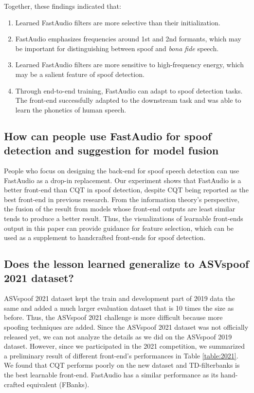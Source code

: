 \documentclass[conference]{IEEEtran}
\begin{document}
Together, these findings indicated that:
\begin{enumerate}

        \item Learned FastAudio filters are more selective than their initialization.
        \item FastAudio emphasizes frequencies around 1st and 2nd formants, which may be important for distinguishing between spoof and \textit{bona fide} speech.
        \item Learned FastAudio filters are more sensitive to high-frequency energy, which may be a salient feature of spoof detection.
        \item Through end-to-end training, FastAudio can adapt to spoof detection tasks. The front-end successfully adapted to the downstream task and was able to learn the phonetics of human speech.

\end{enumerate}

\subsection{\textbf{How can people use FastAudio for spoof detection and suggestion for model fusion}}

People who focus on designing the back-end for spoof speech detection can use FastAudio as a drop-in replacement. Our experiment shows that FastAudio is a better front-end than CQT in spoof detection, despite CQT being reported as the best front-end in previous research\cite{Li2021ReplayAS}. From the information theory's perspective, the fusion of the result from models whose front-end outputs are least similar tends to produce a better result. Thus, the visualizations of learnable front-ends output in this paper can provide guidance for feature selection, which can be used as a supplement to handcrafted front-ends for spoof detection\cite{Xiao2015SpoofingSD}.

\subsection{\textbf{Does the lesson learned generalize to ASVspoof 2021 dataset?}}

ASVspoof 2021 dataset kept the train and development part of 2019 data the same and added a much larger evaluation dataset that is 10 times the size as before. Thus, the ASVspoof 2021 challenge is more difficult because more spoofing techniques are added. Since the ASVspoof 2021 dataset was not officially released yet, we can not analyze the details as we did on the ASVspoof 2019 dataset. However, since we participated in the 2021 competition, we summarized a preliminary result of different front-end's performances in Table \ref{table:2021}. We found that CQT performs poorly on the new dataset and TD-filterbanks is the best learnable front-end. FastAudio has a similar performance as its hand-crafted equivalent (FBanks).
\end{document}
